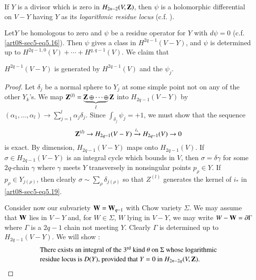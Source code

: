 \setcounter{theorem}{16}
\begin{remark}\label{art08-sec5-rem5.17}
If $Y$ is a divisor which is zero in $H_{2n-2}(V,\mathbf{Z})$, then $\psi$ is a holomorphic differential on $V-Y$ having $Y$ as its {\em logarithmic residue locus} (c.f. \cite{art08-key18}).
\end{remark}

\begin{remark}\label{art08-sec5-rem5.18}
Let\pageoriginale $Y$ be homologous to zero and $\psi$ be a residue operator for $Y$ with $d\psi=0$ (c.f. \eqref{art08-sec5-eq5.16}). Then $\psi$ gives a class in $H^{2q-1}(V-Y)$, and $\psi$ is determined up to $H^{2q-1,0}(V)+\cdots+H^{q,q-1}(V)$. We claim that

$H^{2q-1}(V-Y)$ is generated by $H^{2q-1}(V)$ and the $\psi_{j}$.
\end{remark}

\begin{proof}
Let $\delta_{j}$ be a normal sphere to $Y_{j}$ at some simple point not on any of the other $Y_{k}$'s. We map $\mathbf{Z}^{(l)}=\underbrace{\mathbf{Z}\oplus\cdots\oplus}_{l}\mathbf{Z}$ into $H_{2q-1}(V-Y)$ by $(\alpha_{1},\ldots,\alpha_{l})\to \sum\limits^{l}_{j=1}\alpha_{j}\delta_{j}$. Since $\int_{\delta_{j}}\psi_{j}=+1$, we must show that the sequence
\setcounter{equation}{18}
\begin{equation}
\mathbf{Z}^{(l)}\to H_{2q-1}(V-Y)\xrightarrow{i_{*}}H_{2q-1}(V)\to 0\label{art08-sec5-eq5.19}
\end{equation}
is exact. By dimension, $H_{2q-1}(V-Y)$ maps onto $H_{2q-1}(V)$. If $\sigma\in H_{2q-1}(V-Y)$ is an integral cycle which bounds in $V$, then $\sigma=\delta \gamma$ for some $2q$-chain $\gamma$ where $\gamma$ meets $Y$ transversely in nonsingular points $p_{\rho}\in Y$. If $p_{\rho}\in Y_{j(\rho)}$, then clearly $\sigma\sim \sum\limits_{\rho}\delta_{j(\rho)}$ so that $Z^{(l)}$ generates the kernel of $i_{*}$ in \eqref{art08-sec5-eq5.19}.

Consider now our subvariety $\mathbf{W}=\mathbf{W}_{q-1}$ with Chow variety $\Sigma$. We may assume that $\mathbf{W}$ lies in $V-Y$ and, for $W\in \Sigma$, $W$ lying in $V-Y$, we may write $W-\mathbf{W}=\partial\Gamma$ where $\Gamma$ is a $2q-1$ chain not meeting $Y$. Clearly $\Gamma$ is determined up to $H_{2q-1}(V-Y)$. We will show :
\begin{equation}
\begin{array}{l}
\text{There exists an integral of the $3^{\text{rd}}$ kind $\theta$ on $\Sigma$ whose logarithmic}\\[2pt]
\text{residue locus is $D(Y)$, provided that $Y=0$ in $H_{2n-2q}(V,\mathbf{Z})$.}
\end{array}\label{art08-sec5-eq5.20}
\end{equation}
\end{proof}

